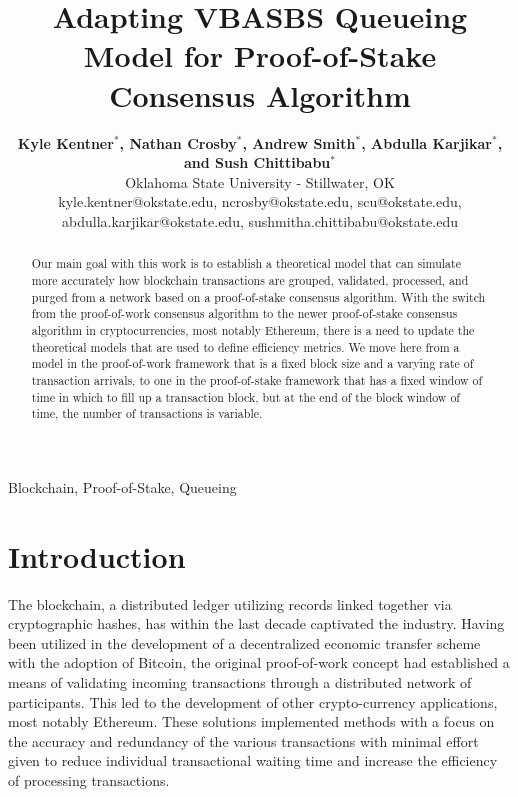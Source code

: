 \documentclass[conference]{IEEEtran}
\begin{document}
\title{Adapting VBASBS Queueing Model for Proof-of-Stake Consensus Algorithm}

\author{
  \textbf{Kyle Kentner$^*$, Nathan Crosby$^*$, Andrew Smith$^*$, Abdulla Karjikar$^*$, and Sush Chittibabu$^*$}\\
  Oklahoma State University - Stillwater, OK \\
  kyle.kentner@okstate.edu, ncrosby@okstate.edu, scu@okstate.edu, \\
  abdulla.karjikar@okstate.edu, sushmitha.chittibabu@okstate.edu}

\maketitle

\def\thefootnote{*}\def\thefootnote{\arabic{footnote}}

\begin{abstract}

Our main goal with this work is to establish a theoretical model that can simulate
more accurately how blockchain transactions are grouped, validated, processed,
and purged from a network based on a proof-of-stake consensus algorithm. With 
the switch from the proof-of-work consensus algorithm to the newer proof-of-stake
consensus algorithm in cryptocurrencies, most notably Ethereum, there is a need to 
update the theoretical models that are used to define efficiency metrics. We move 
here from a model in the proof-of-work framework that is a fixed block size and a 
varying rate of transaction arrivals, to one in the proof-of-stake framework that
has a fixed window of time in which to fill up a transaction block, but at the end of 
the block window of time, the number of transactions is variable. 
\end{abstract}

\begin{IEEEkeywords}
Blockchain, Proof-of-Stake, Queueing
\end{IEEEkeywords}

\section{Introduction}\label{Intro}

The blockchain, a distributed ledger utilizing records linked together via cryptographic 
hashes, has within the last decade captivated the industry. Having been utilized in the 
development of a decentralized economic transfer scheme with the adoption of 
Bitcoin\cite{2008_Bitcoin_Nakamoto}, the original proof-of-work concept had established 
a means of validating incoming transactions through a distributed network of participants. 
This led to the development of other crypto-currency applications, most notably Ethereum. 
These solutions implemented methods with a focus on the accuracy and redundancy of the 
various transactions with minimal effort given to reduce individual transactional waiting 
time and increase the efficiency of processing transactions.
\end{document}

